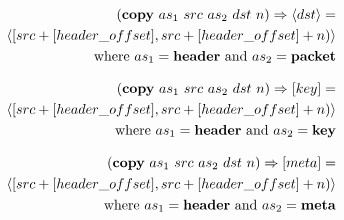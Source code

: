 \documentclass{article}
\begin{document}
\begin{equation}
\begin{split}
  (\textrm{\textbf{copy}} \ as_1 \ src \ as_2 \ dst \ n) \Rightarrow \langle
  dst \rangle = \\
  \langle [src + [header\_offset], src + [header\_offset] + n) \rangle \\ 
    \textrm{where} \ as_1 = \textrm{\textbf{header} and } as_2 =
    \textrm{\textbf{packet}}
\end{split}
\end{equation}

\begin{equation}
\begin{split}
  (\textrm{\textbf{copy}} \ as_1 \ src \ as_2 \ dst \ n) \Rightarrow [key] = \\
  \langle [src + [header\_offset], src + [header\_offset] + n) \rangle \\ 
    \textrm{where} \ as_1 = \textrm{\textbf{header} and } as_2 =
    \textrm{\textbf{key}}
\end{split}
\end{equation}

\begin{equation}
\begin{split}
  (\textrm{\textbf{copy}} \ as_1 \ src \ as_2 \ dst \ n) \Rightarrow [meta] = \\
  \langle [src + [header\_offset], src + [header\_offset] + n) \rangle \\ 
    \textrm{where} \ as_1 = \textrm{\textbf{header} and } as_2 =
    \textrm{\textbf{meta}}
\end{split}
\end{equation}
\end{document}
